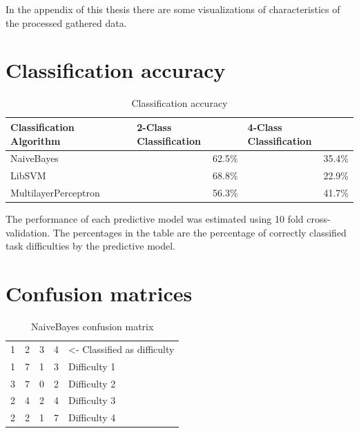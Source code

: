 \documentclass[11pt,leqno,a4paper]{report} %
\begin{document}
In the appendix of this thesis there are some visualizations of characteristics of the processed gathered data.

\pagebreak




\section{Classification accuracy}
\begin{table}[h]
\caption {Classification accuracy} 
\center
\begin{tabular}{@{}lrr@{}}
\toprule
Classification Algorithm & \multicolumn{1}{l}{2-Class Classification} & \multicolumn{1}{l}{4-Class Classification} \\ \midrule
NaiveBayes               & 62.5\%                                     & 35.4\%                                     \\
LibSVM                   & 68.8\%                                     & 22.9\%                                     \\
MultilayerPerceptron     & 56.3\%                                     & 41.7\%                                     \\ \bottomrule
\end{tabular}
\end{table}

The performance of each predictive model was estimated using 10 fold cross-validation. The percentages in the table are the percentage of correctly classified task difficulties by the predictive model.

\pagebreak

\section{Confusion matrices}

\begin{table}[h]
\caption {NaiveBayes confusion matrix} 
\center
\begin{tabular}{ccccl}
\multicolumn{1}{l}{1} & \multicolumn{1}{l}{2} & \multicolumn{1}{l}{3} & \multicolumn{1}{l}{4} & \small{\textless- Classified as difficulty} \\ \cline{1-4}
1                          & 7                          & 1                          & \multicolumn{1}{c|}{3}     & Difficulty 1                    \\
3                          & 7                          & 0                          & \multicolumn{1}{c|}{2}     & Difficulty 2                    \\
2                          & 4                          & 2                          & \multicolumn{1}{c|}{4}     & Difficulty 3                    \\
2                          & 2                          & 1                          & \multicolumn{1}{c|}{7}     & Difficulty 4                   
\end{tabular}
\end{table}
\end{document}
